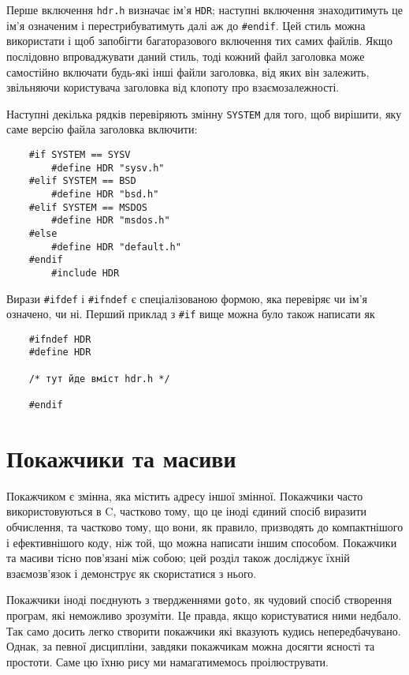 \documentclass[a4paper,12pt]{book}
\begin{document}
  Перше включення \texttt{hdr.h} визначає ім'я \texttt{HDR}; наступні включення
  знаходитимуть це ім'я означеним і перестрибуватимуть далі аж до \texttt{\#endif}. Цей
  стиль можна використати і щоб запобігти багаторазового включення тих самих файлів. Якщо
  послідовно впроваджувати даний стиль, тоді кожний файл заголовка може самостійно
  включати будь-які інші файли заголовка, від яких він залежить, звільняючи користувача
  заголовка від клопоту про взаємозалежності.

  Наступні декілька рядків перевіряють змінну \texttt{SYSTEM} для того, щоб вирішити, яку
  саме версію файла заголовка включити:
  \begin{verbatim}
    #if SYSTEM == SYSV
        #define HDR "sysv.h"
    #elif SYSTEM == BSD
        #define HDR "bsd.h"
    #elif SYSTEM == MSDOS
        #define HDR "msdos.h"
    #else
        #define HDR "default.h"
    #endif
        #include HDR
  \end{verbatim}

  Вирази \texttt{\#ifdef} і \texttt{\#ifndef} є спеціалізованою формою, яка
  перевіряє чи ім'я означено, чи ні. Перший приклад з \texttt{\#if} вище можна було також
  написати як
  \begin{verbatim}
    #ifndef HDR
    #define HDR

    /* тут йде вміст hdr.h */

    #endif
  \end{verbatim}

\chapter{Покажчики та масиви}

\label{f0:ch5}
  Покажчиком є змінна, яка містить адресу іншої змінної. Покажчики часто
  використовуються в C, частково тому, що це іноді єдиний спосіб виразити обчислення, та
  частково тому, що вони, як правило, призводять до компактнішого і ефективнішого коду,
  ніж той, що можна написати іншим способом. Покажчики та масиви тісно пов'язані між
  собою; цей розділ також досліджує їхній взаємозв'язок і демонструє як скористатися
  з нього.

  Покажчики іноді поєднують з твердженнями \texttt{goto}, як чудовий спосіб створення
  програм, які неможливо зрозуміти. Це правда, якщо користуватися ними недбало. Так само
  досить легко створити покажчики які вказують кудись непередбачувано. Однак, за певної
  дисципліни, завдяки покажчикам можна досягти ясності та простоти. Саме цю їхню рису ми
  намагатимемось проілюструвати.
\end{document}
